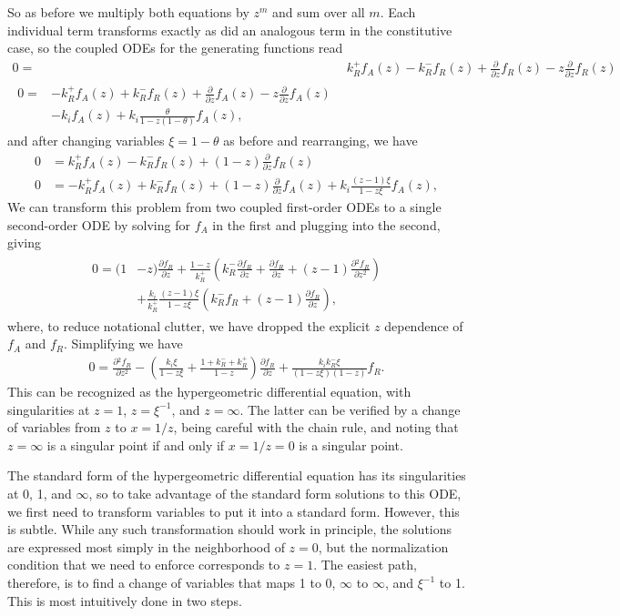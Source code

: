 \documentclass[12pt]{article}%
\newcommand{\pderiv}[2][{}]{\frac{\partial #1}{\partial #2}}
\newcommand{\psecderiv}[2][{}]{\frac{\partial{^2} #1}{\partial #2{^2}}}
\begin{document}
So as before we multiply both equations by $z^m$ and sum over all $m$.
Each individual term transforms exactly as did an analogous term in
the constitutive case, so the coupled ODEs for the generating functions read
\begin{align}
0 =& k_R^+ f_A(z) - k_R^- f_R(z) + \pderiv{z} f_R(z) - z \pderiv{z} f_R(z)
\\
\begin{split}
0 =&  - k_R^+ f_A(z) + k_R^- f_R(z) + \pderiv{z} f_A(z) - z \pderiv{z} f_A(z)
\\
&- k_i f_A(z) + k_i \frac{\theta}{1-z(1-\theta)} f_A(z),
\end{split}
\end{align}
and after changing variables $\xi = 1 - \theta$ as before
and rearranging, we have
\begin{align}
0 &= k_R^+ f_A(z) - k_R^- f_R(z) + (1-z) \pderiv{z} f_R(z)
\\
0 &=  - k_R^+ f_A(z) + k_R^- f_R(z) + (1 - z) \pderiv{z} f_A(z)
+ k_i \frac{(z-1)\xi}{1-z\xi} f_A(z),
\end{align}
We can transform this problem from two coupled first-order ODEs to a
single second-order ODE by solving for $f_A$ in the first and plugging
into the second, giving
\begin{align}
\begin{split}
0 = (1&-z) \pderiv[f_R]{z}
+ \frac{1-z}{k_R^+}
        \left(k_R^- \pderiv[f_R]{z} + \pderiv[f_R]{z} +(z-1) \psecderiv[f_R]{z}\right)
\\
&+ \frac{k_i}{k_R^+} \frac{(z-1)\xi}{1-z\xi}
        \left(k_R^- f_R + (z-1) \pderiv[f_R]{z}\right),
\end{split}
\end{align}
where, to reduce notational clutter, we have dropped the explicit $z$
dependence of $f_A$ and $f_R$. Simplifying we have
\begin{align}
0 = \psecderiv[f_R]{z}
        - \left(\frac{k_i\xi}{1-z\xi}
                + \frac{1 + k_R^- + k_R^+}{1-z}
        \right)\pderiv[f_R]{z}
        + \frac{k_i k_R^- \xi}{(1-z\xi)(1-z)}f_R.
\end{align}
This can be recognized as the hypergeometric differential equation,
with singularities at $z=1$, $z=\xi^{-1}$, and $z=\infty$. The latter
can be verified by a change of variables from $z$ to $x=1/z$,
being careful with the chain rule, and noting that $z=\infty$ is a
singular point if and only if $x=1/z=0$ is a singular point.

The standard form of the hypergeometric differential equation has its
singularities at 0, 1, and $\infty$, so to take advantage of the
standard form solutions to this ODE, we first need to transform
variables to put it into a standard form.
However, this is subtle. While any such transformation should work in
principle, the solutions are expressed most simply in the neighborhood
of $z=0$, but the normalization condition that we need to enforce
corresponds to $z=1$. The easiest path, therefore, is to find a change
of variables that maps
1 to 0, $\infty$ to $\infty$, and $\xi^{-1}$ to 1.
This is most intuitively done in two steps.
\end{document}
